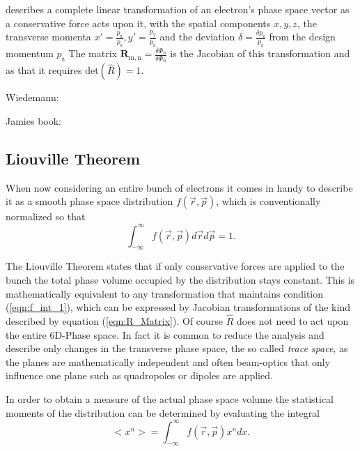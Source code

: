 describes a complete linear transformation of an electron's phase space vector as a conservative force acts upon it, with the spatial components $x,y,z$, the transverse momenta $x'=\frac{p_\mathrm{x}}{p_\mathrm{z}},y'=\frac{p_\mathrm{y}}{p_\mathrm{z}}$ and the deviation  $\delta=\frac{\delta p_\mathrm{z}}{p_\mathrm{z}}$ from the design momentum $p_\mathrm{z}$
The matrix $\mathbf{R}_\mathrm{m,n}= \frac{\delta \Phi_\mathrm{n}}{\delta \Phi_\mathrm{n}}$ is the Jacobian of this transformation and as that it requires $\mathrm{det}(\hat{R})=1$.


Wiedemann:\cite{Wiedemann_accelerator}


 Jamies book: \cite{Book_Fundamentals_Rosenzweig}
\subsection{Liouville Theorem}
When now considering an entire bunch of electrons it comes in handy to describe it as a smooth phase space distribution
$f(\vec{r},\vec{p})$, which is conventionally normalized so that  
\begin{equation}
\label{eqn:f_int_1}
\int^{\infty}_{-\infty}f(\vec{r},\vec{p})d\vec{r}d\vec{p}=1 .
\end{equation}

The Liouville Theorem states that if only conservative forces are applied to the bunch the total phase volume occupied by the distribution stays constant. This is mathematically equivalent to any transformation that maintains condition (\ref{eqn:f_int_1}), which can be expressed by Jacobian transformations of the kind described by equation (\ref{eqn:R_Matrix}).
Of course $\hat{R}$ does not need to act upon the entire 6D-Phase space. In fact it is common to reduce the analysis and describe only changes in the transverse phase space, the so called \textit{trace space}, as the planes are mathematically independent and often beam-optics that only influence one plane such as quadropoles or dipoles are applied.

In order to obtain a measure of the actual phase space volume the statistical moments of the distribution can be determined by evaluating the integral 
\begin{equation}
<x^n>=\int_{-\infty}^{\infty}f(\vec{r},\vec{p})x^n dx.
\end{equation}
